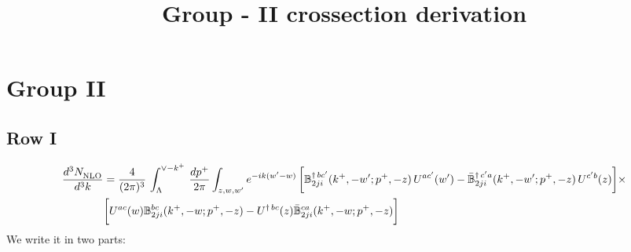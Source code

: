\documentclass[9pt]{article}
\title{Group - II crossection derivation}
\author{}
\date{}
\def\mf#1{\mathbb{#1}}
\numberwithin{equation}{section}
\begin{document}
\maketitle
\section{Group II}
\subsection{Row I\,}
\begin{align}
    \frac{d^{3}N_{\rm NLO}^{\rm}}{d^{3}k}  & = \frac{4}{(2\pi)^{3}}\,\int_{\Lambda}^{\vee-k^{+}}\, \frac{dp^{+}}{2\pi}\int_{z,w,w^{\prime}} e^{-ik(w^{\prime}-w)}\, \bigg[\mf{B}^{\dagger\, bc^{\prime}}_{2ji}(k^{+},-w^{\prime};p^{+},-z)\,U^{ac^{\prime}}(w^{\prime}) -\Bar{\mf{B}}^{\dagger\, c^{\prime}a}_{2ji}(k^{+},-w^{\prime}; p^{+},-z)\,U^{c^{\prime}b}(z)\bigg]\times\notag \\ & \bigg[U^{ac}(w) \mf{B}^{bc}_{2ji}(k^{+},-w;p^{+},-z) -U^{\dagger\, bc}(z)\Bar{\mf{B}}^{ca}_{2ji}(k^{+},-w; p^{+},-z)\bigg]\nonumber
\end{align}
We write it in two parts: 
\end{document}
